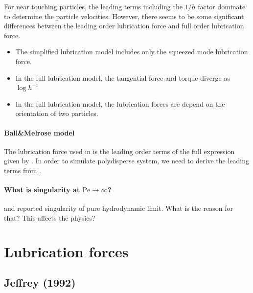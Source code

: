 \documentclass[12pt]{article}
\begin{document}
For near touching particles,
the leading terms including the $1/h$ factor
dominate to determine the particle velocities.
%
However, there seems
to be some significant differences
between the leading order lubrication force 
and full order lubrication force.

\begin{itemize}
  \item The simplified lubrication model
  includes only the squeezed mode lubrication force.
  \item 
  In the full lubrication model,
  the tangential force and torque
  diverge as $\log h^{-1}$
  \item 
  In the full lubrication model,
  the lubrication forces are depend on
  the orientation of two particles.
  \end{itemize}


\paragraph{Ball\&Melrose model}

The lubrication force used in \cite{Ball_1997}
is the leading order terms of 
the full expression given by \citet{Jeffrey_1992}.
%
In order to simulate  polydisperse system,
we need to derive 
the leading terms from \citet{Jeffrey_1992}.


\paragraph{What is singularity at $\mathrm{Pe}\to \infty$?}

\citet{Ball_1995}
and \citet{Melrose_1995}
reported singularity of pure hydrodynamic limit.
%
What is the reason for that?
%
This affects the physics?
%


\newpage


\section{Lubrication forces}

\subsection*{Jeffrey (1992)}
\end{document}
